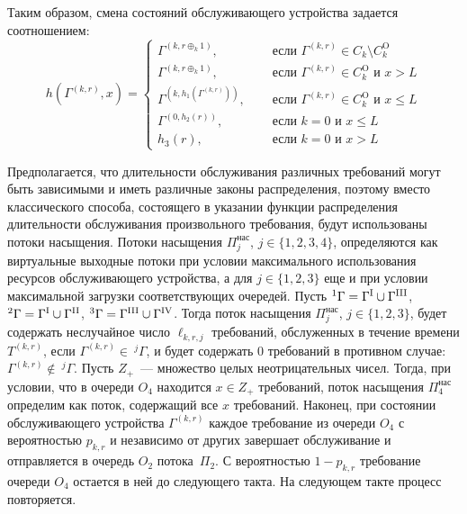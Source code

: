 \documentclass[a4paper,12pt,russian]{extarticle}
\newcommand{\G}{\Gamma}
\newcommand{\ga}[1]{\Gamma^{\left( #1 \right)} }
\newcommand{\Tt}[1]{T^{\left( #1 \right)} }
\begin{document}
Таким образом, смена состояний обслуживающего устройства задается соотношением:
\begin{equation}
h(\ga{k,r},x) = 
\begin{cases}
\ga{k,r\oplus_k 1},& \quad \text{ если } \ga{k,r}\in C_k\setminus C_k^{\mathrm{O}}\\
\ga{k,r\oplus_k 1},& \quad \text{ если } \ga{k,r}\in C_k^{\mathrm{O}} \text{ и } x>L\\
\ga{k,h_1(\ga{k,r})},& \quad \text{ если } \ga{k,r}\in C_k^{\mathrm{O}} \text{ и } x\leqslant L\\
\ga{0,h_2(r)},& \quad \text{ если } k=0 \text{ и } x\leqslant L\\
h_3(r),& \quad \text{ если } k=0 \text{ и } x > L
\end{cases}
\label{hLaw}
\end{equation}

Предполагается, что длительности обслуживания различных требований могут быть зависимыми и иметь различные законы распределения, поэтому вместо классического способа, состоящего в указании функции распределения длительности обслуживания произвольного требования, будут использованы потоки насыщения. Потоки насыщения $\Pi^{\mathrm{\text{нас}}}_j$, $j \in \{1,2,3,4\}$, определяются как виртуальные выходные потоки при 
условии максимального использования ресурсов обслуживающего устройства, а для $j\in \{1, 2, 3\}$ еще и при условии максимальной загрузки соответствующих очередей. Пусть ${}^1\G=\G^{\mathrm{\Rmnum{1}}} \cup \G^{\mathrm{\Rmnum{3}}}$, 
${}^2\G=\G^{\mathrm{\Rmnum{1}}} \cup \G^{\mathrm{\Rmnum{2}}}$,
${}^3\G=\G^{\mathrm{\Rmnum{3}}} \cup \G^{\mathrm{\Rmnum{4}}}$. 
Тогда поток насыщения $\Pi^{\mathrm{\text{нас}}}_j$, $j\in \{1,2,3\}$, будет содержать неслучайное число $\ell_{k,r,j}$ требований, обслуженных в течение времени $\Tt{k,r}$, если $\ga{k,r} \in~^j\G$, и будет содержать $0$ требований в противном случае: $\ga{k,r} \notin ~^j\G$. Пусть $Z_+$~--- множество целых неотрицательных чисел. Тогда, при условии, что в очереди $O_4$ находится $x \in Z_+$ требований, поток насыщения $\Pi^{\mathrm{\text{нас}}}_4$ определим как поток, содержащий все $x$ требований.
Наконец, при состоянии обслуживающего устройства $\ga{k,r}$ каждое требование из очереди $O_4$ с вероятностью $p_{k,r}$ и независимо от других завершает обслуживание и отправляется в очередь $O_2$ потока~$\Pi_2$. С вероятностью $1-p_{k,r}$ требование очереди $O_4$ остается в ней до следующего такта. На следующем такте процесс повторяется.
\end{document}
